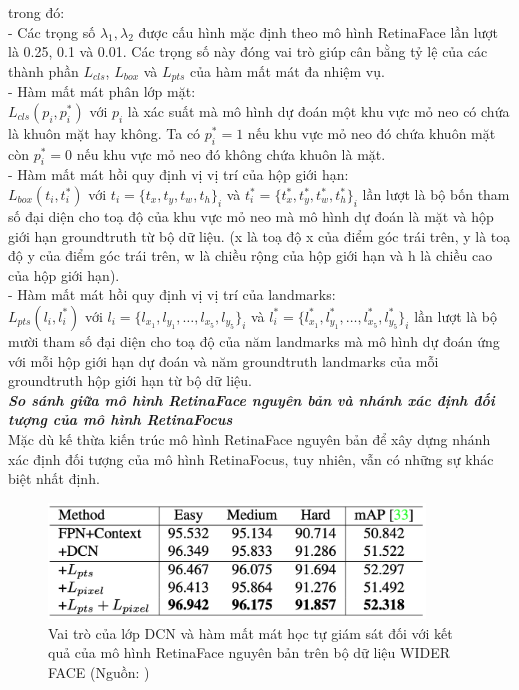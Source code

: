 {    \noindent
    trong đó: \\
    - Các trọng số $\lambda_1, \lambda_2$ được cấu hình mặc định theo mô hình RetinaFace \cite{deng2020retinaface} lần lượt là 0.25, 0.1 và 0.01. Các trọng số này đóng vai trò giúp cân bằng tỷ lệ của các thành phần $L_{cls}$, $L_{box}$ và $L_{pts}$ của hàm mất mát đa nhiệm vụ. \\
    - Hàm mất mát phân lớp mặt: \\
    $L_{cls}(p_i, p^{*}_i)$ với $p_i$ là xác suất mà mô hình dự đoán một khu vực mỏ neo có chứa là khuôn mặt hay không.
    Ta có $p^{*}_i = 1$ nếu khu vực mỏ neo đó chứa khuôn mặt còn $p^{*}_i = 0$ nếu khu vực mỏ neo đó không chứa khuôn là mặt. \\
    - Hàm mất mát hồi quy định vị vị trí của hộp giới hạn: \\
    $L_{box}(t_i, t^{*}_i)$ với $t_i=\{t_x, t_y, t_w, t_h\}_i$ và $t^{*}_i=\{t^{*}_x, t^{*}_y, t^{*}_w, t^{*}_h\}_i$ lần lượt là bộ bốn tham số đại diện cho toạ độ của khu vực mỏ neo mà mô hình dự đoán là mặt và hộp giới hạn groundtruth từ bộ dữ liệu.
    (x là toạ độ x của điểm góc trái trên, y là toạ độ y của điểm góc trái trên, w là chiều rộng của hộp giới hạn và h là chiều cao của hộp giới hạn). \\
    - Hàm mất mát hồi quy định vị vị trí của landmarks: \\
    $L_{pts} (l_i, l^{*}_i)$ với $l_i=\{l_{x_1}, l_{y_1}, \dots , l_{x_5}, l_{y_5}\}_i$ và $l^{*}_i=\{l^{*}_{x_1}, l^{*}_{y_1}, \dots , l^{*}_{x_5}, l^{*}_{y_5}\}_i$ lần lượt là bộ mười tham số đại diện cho toạ độ của năm landmarks mà mô hình dự đoán ứng với mỗi hộp giới hạn dự đoán và năm groundtruth landmarks của mỗi groundtruth hộp giới hạn từ bộ dữ liệu. \\

    \noindent
    \textbf{\textit{So sánh giữa mô hình RetinaFace nguyên bản và nhánh xác định đối tượng của mô hình RetinaFocus}} \\
    Mặc dù kế thừa kiến trúc mô hình RetinaFace nguyên bản để xây dựng nhánh xác định đối tượng của mô hình RetinaFocus, tuy nhiên, vẫn có những sự khác biệt nhất định.

    \begin{figure}[H]
        \centering
        \includegraphics[width=10cm] {images/retinaface_results_1}
        \caption{Vai trò của lớp DCN và hàm mất mát học tự giám sát đối với kết quả của mô hình RetinaFace nguyên bản trên bộ dữ liệu WIDER FACE (Nguồn: \cite{deng2020retinaface})}
        \label{fig:retinaface_results_1}
    \end{figure}

}
